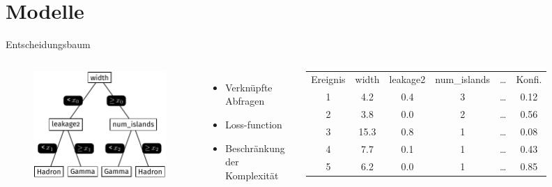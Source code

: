 \documentclass[aspectratio=1610, professionalfonts, 9pt]{beamer}
\begin{document}
\section{Modelle}
\begin{frame}{Entscheidungsbaum}
  \begin{columns}[onlytextwidth]
	\begin{figure}
	  \centering
	  \includegraphics[width=\textwidth]{./tikz/Tree/Tree.pdf}
	\end{figure}
	\begin{itemize}
	  \item Verknüpfte Abfragen 
	  \item Loss-function
	  \item Beschränkung der Komplexität 
	\end{itemize}
	\begin{table}	  
	  \centering
	  \begin{tabular}{c c c c c c}
		\toprule
		Ereignis & width & leakage2 & num\_islands & \dots & Konfi. \\ 
		\cmidrule(r){1-1} 	\cmidrule{2-5} \cmidrule(l){6-6}
		1 & \num{4.2}  & \num{0.4}  & \num{3} & \dots & \num{0.12} \\
		2 & \num{3.8}  & \num{0.0}  & \num{2} & \dots & \num{0.56} \\
		3 & \num{15.3} & \num{0.8} 	& \num{1} & \dots & \num{0.08} \\
		4 & \num{7.7}  & \num{0.1}  & \num{1} & \dots & \num{0.43} \\
		5 & \num{6.2}  & \num{0.0}  & \num{1} & \dots & \num{0.85} \\
		\bottomrule
	  \end{tabular}
	\end{table}
  \end{columns}
\end{frame}
\end{document}

